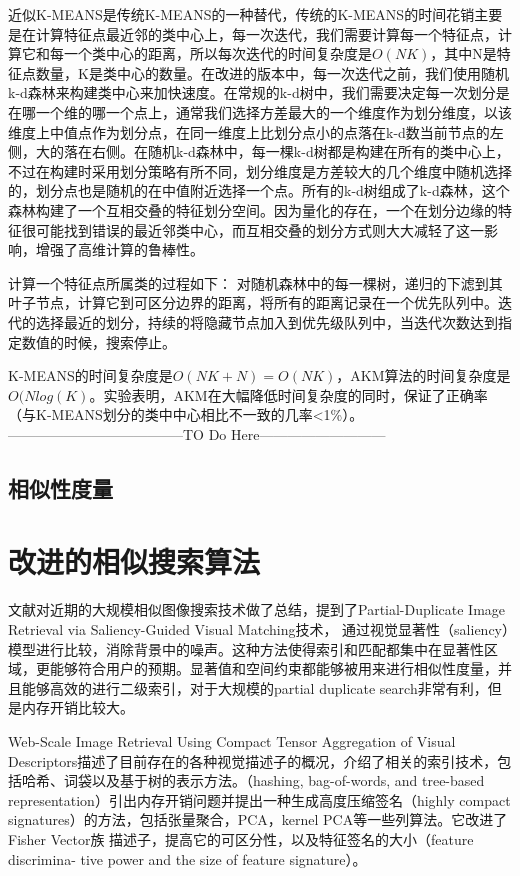 近似K-MEANS是传统K-MEANS的一种替代，传统的K-MEANS的时间花销主要是在计算特征点最近邻的类中心上，每一次迭代，我们需要计算每一个特征点，计算它和每一个类中心的距离，所以每次迭代的时间复杂度是\(O(NK)\)，其中N是特征点数量，K是类中心的数量。在改进的版本中，每一次迭代之前，我们使用随机k-d森林来构建类中心来加快速度。在常规的k-d树中，我们需要决定每一次划分是在哪一个维的哪一个点上，通常我们选择方差最大的一个维度作为划分维度，以该维度上中值点作为划分点，在同一维度上比划分点小的点落在k-d数当前节点的左侧，大的落在右侧。在随机k-d森林中，每一棵k-d树都是构建在所有的类中心上，不过在构建时采用划分策略有所不同，划分维度是方差较大的几个维度中随机选择的，划分点也是随机的在中值附近选择一个点。所有的k-d树组成了k-d森林，这个森林构建了一个互相交叠的特征划分空间。因为量化的存在，一个在划分边缘的特征很可能找到错误的最近邻类中心，而互相交叠的划分方式则大大减轻了这一影响，增强了高维计算的鲁棒性。

计算一个特征点所属类的过程如下：
对随机森林中的每一棵树，递归的下滤到其叶子节点，计算它到可区分边界的距离，将所有的距离记录在一个优先队列中。迭代的选择最近的划分，持续的将隐藏节点加入到优先级队列中，当迭代次数达到指定数值的时候，搜索停止。

K-MEANS的时间复杂度是\(O(NK+N) = O(NK)\)，AKM算法的时间复杂度是\(O(Nlog(K)\)。实验表明，AKM在大幅降低时间复杂度的同时，保证了正确率（与K-MEANS划分的类中中心相比不一致的几率<1\%）。
--------------------------------------TO Do Here---------------------------

\subsection{相似性度量}

\section{改进的相似搜索算法}
文献\cite{POLICY:2013te}对近期的大规模相似图像搜索技术做了总结，提到了Partial-Duplicate Image Retrieval via Saliency-Guided Visual Matching\cite{Li:2013ks}技术，
通过视觉显著性（saliency）模型进行比较，消除背景中的噪声。这种方法使得索引和匹配都集中在显著性区域，更能够符合用户的预期。显著值和空间约束都能够被用来进行相似性度量，并且能够高效的进行二级索引，对于大规模的partial duplicate search非常有利，但是内存开销比较大。

Web-Scale Image Retrieval Using Compact Tensor Aggregation of Visual Descriptors\cite{Negrel:2013ur}描述了目前存在的各种视觉描述子的概况，介绍了相关的索引技术，包括哈希、词袋以及基于树的表示方法。（hashing, bag-of-words, and tree-based representation）引出内存开销问题并提出一种生成高度压缩签名（highly compact signatures）的方法，包括张量聚合，PCA，kernel PCA等一些列算法。它改进了Fisher Vector族 描述子，提高它的可区分性，以及特征签名的大小（feature discrimina- tive power and the size of feature signature）。

